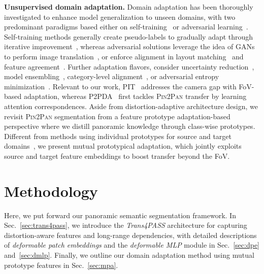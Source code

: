 \documentclass[final]{cvpr}
\begin{document}
\noindent\textbf{Unsupervised domain adaptation.}
Domain adaptation has been thoroughly investigated to enhance model generalization to unseen domains, with two predominant paradigms based either on self-training~\cite{cheng2021dual_path,guo2021metacorrection,curriculum_da} or adversarial learning~\cite{all_about_structure,cycada,adaptsegnet}. Self-training methods generally create pseudo-labels to gradually adapt through iterative improvement~\cite{pycda}, whereas adversarial solutions leverage the idea of GANs~\cite{gan} to perform image translation~\cite{cycada,li2019bidirectional}, or enforce alignment in layout matching~\cite{contextual_relation_consistent_da,content_consistent_matching_da} and feature agreement~\cite{clan,densepass}.
Further adaptation flavors, consider uncertainty reduction~\cite{fleuret2021uncertainty_reduction,rectifying}, model ensembling~\cite{maximum_squares_loss,fda}, category-level alignment~\cite{liu2021bapa,ma2021coarse_fine}, or adversarial entropy minimization~\cite{intra_da,advent}.
Relevant to our work, PIT~\cite{gu2021pit} addresses the camera gap with FoV-based adaptation, whereas P2PDA~\cite{densepass} first tackles \textsc{Pin2Pan} transfer by learning attention correspondences.
Aside from distortion-adaptive architecture design, we revisit \textsc{Pin2Pan} segmentation from a feature prototype adaptation-based perspective where we distill panoramic knowledge through class-wise prototypes.
Different from methods using individual prototypes for source and target domains~\cite{yue2021pcs,proda}, we present mutual prototypical adaptation, which jointly exploits source and target feature embeddings to boost transfer beyond the FoV.

\section{Methodology}
Here, we put forward our panoramic semantic segmentation framework. In Sec.~\ref{sec:trans4pass}, we introduce the \emph{Trans4PASS} architecture for capturing distortion-aware features and long-range dependencies, with detailed descriptions of \emph{deformable patch embeddings} and the \emph{deformable MLP} module in Sec.~\ref{sec:dpe} and~\ref{sec:dmlp}. Finally, we outline our domain adaptation method using mutual prototype features in Sec.~\ref{sec:mpa}.
\end{document}
